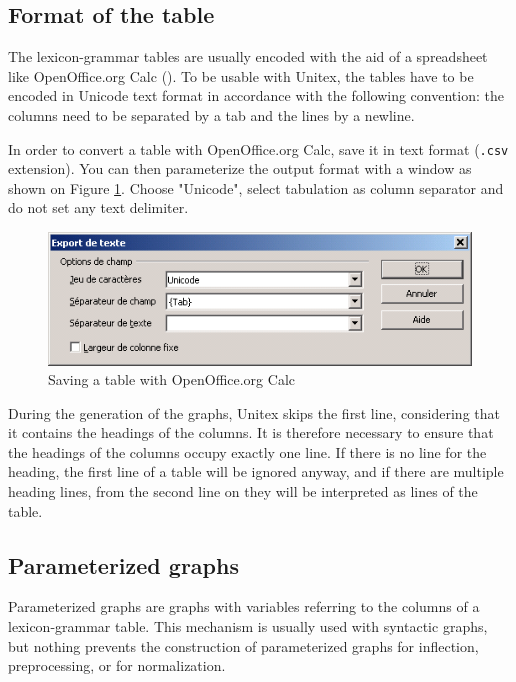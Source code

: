 \subsection{Format of the table}
The lexicon-grammar tables are usually encoded with the aid of a spreadsheet like
OpenOffice.org Calc (\cite{OpenOffice}). To be usable with Unitex, the
tables have to be encoded in Unicode text format in accordance with the following
convention: the columns need to be separated by a tab and the lines by a newline.

\bigskip
\noindent In order to convert a table with OpenOffice.org Calc, save it in text
format (\verb$.csv$ extension). You can then parameterize the output format with a
window as shown on Figure \ref{fig-csv-export}. Choose "Unicode", select
tabulation as column separator and do not set any text delimiter.

\begin{figure}[!ht]
\begin{center}
\includegraphics[width=12cm]{resources/img/fig8-2.png}
\caption{Saving a table with OpenOffice.org Calc\label{fig-csv-export}}
\end{center}
\end{figure}

\bigskip
\noindent During the generation of the graphs, Unitex skips the first line, 
considering that it
contains the headings of the columns. It is therefore necessary to ensure that
the headings of the columns occupy exactly one line. If there is no line for the
heading, the first line of a table will be ignored anyway, and if there are
multiple heading lines, from the second line on they will be interpreted as lines
of the table.


\subsection{Parameterized graphs}
Parameterized graphs are graphs with variables referring to the columns of a
lexicon-grammar table. This mechanism is usually used with syntactic
graphs, but nothing prevents the construction of parameterized graphs for
inflection, preprocessing, or for normalization.

